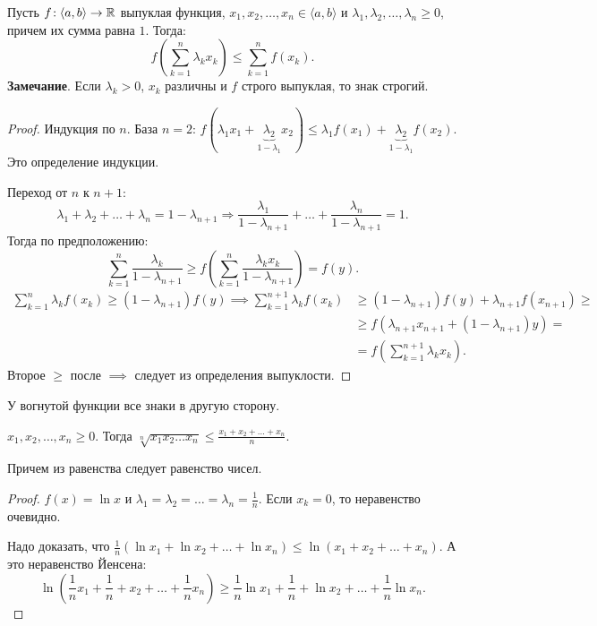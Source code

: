 \begin{theorem}
    Пусть $f\!: \langle a, b \rangle \to \mathbb{R}$ выпуклая функция,  $x_1, x_2,\ldots, x_n \in \langle a, b \rangle$ и $\lambda_1, \lambda_2, \ldots, \lambda_n \ge 0$, причем их сумма равна $1$. Тогда: \[
        f(\sum_{k=1}^n \lambda_k x_k) \le \sum_{k=1}^n f(x_k)
    .\] 
    \textbf{Замечание}. Если $\lambda_k > 0$,  $x_k$ различны и  $f$ строго выпуклая, то знак строгий.
\end{theorem}
\begin{proof}
    Индукция по $n$. База  $n = 2$:  $f(\lambda_1 x_1 + \underbrace{\lambda_2}_{1 - \lambda_1} x_2) \le \lambda_1f(x_1) + \underbrace{\lambda_2}_{1-\lambda_1}f(x_2)$. Это определение индукции.

    Переход от $n$ к  $n+1$:  \[
\lambda_1 + \lambda_2 + \ldots + \lambda_n = 1 - \lambda_{n+1} \Rightarrow \frac{\lambda_1}{1 - \lambda_{n+1}} + \ldots + \frac{\lambda_n}{1 - \lambda_{n+1}} = 1    
    .\]
    Тогда по предположению: \[
        \sum_{k=1}^n \frac{\lambda_k}{1 - \lambda_{n+1}} \ge f(\sum_{k=1}^n \frac{\lambda_k x_k}{1 - \lambda_{n+1}}) = f(y)
    .\]
    \begin{align*}
        \sum_{k=1}^{n} \lambda_kf(x_k) \ge (1-\lambda_{n+1})f(y) \implies \sum_{k=1}^{n+1} \lambda_k f(x_k) &\ge (1 - \lambda_{n+1})f(y) + \lambda_{n+1}f(x_{n+1}) \ge \\
                                                                                                            &\ge f(\lambda_{n+1} x_{n+1} + (1 - \lambda_{n+1})y) =\\
                                                                                                            &=f(\sum_{k=1}^{n+1}\lambda_k x_k)
     .\end{align*}
     Второе $\ge$ после $\implies$ следует из определения выпуклости.
\end{proof}
\begin{consequence}
    У вогнутой функции все знаки в другую сторону.
\end{consequence}
\begin{theorem}
    $x_1, x_2, \ldots, x_n \ge 0$. Тогда $\sqrt[n]{x_1x_2\ldots x_n} \le \frac{x_1 + x_2 + \ldots + x_n}{n}$.
    
    Причем из равенства следует равенство чисел.
\end{theorem}
\begin{proof}
    $f(x) = \ln x$ и  $\lambda_1 = \lambda_2 = \ldots = \lambda_n = \frac{1}{n}$. Если $x_k = 0$, то неравенство очевидно.

    Надо доказать, что  $\frac{1}{n}(\ln x_1 + \ln x_2 + \ldots + \ln x_n) \le \ln(x_1 + x_2 + \ldots + x_n)$. А это неравенство Йенсена: \[
        \ln(\frac{1}{n} x_1 + \frac{1}{n} + x_2 + \ldots + \frac{1}{n}x_n) \ge \frac{1}{n}\ln x_1 + \frac{1}{n} + \ln x_2 + \ldots + \frac{1}{n} \ln x_n
    .\] 
\end{proof}
